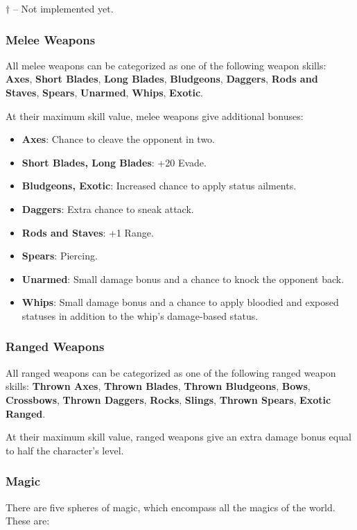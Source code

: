 $\dagger$ -- Not implemented yet.

\subsubsection{Melee Weapons}

All melee weapons can be categorized as one of the following weapon skills: {\bf Axes}, {\bf Short Blades}, {\bf Long Blades}, {\bf Bludgeons}, {\bf Daggers}, {\bf Rods and Staves}, {\bf Spears}, {\bf Unarmed}, {\bf Whips}, {\bf Exotic}.

At their maximum skill value, melee weapons give additional bonuses:

\begin{itemize}
\item{\bf Axes}: Chance to cleave the opponent in two.
\item{\bf Short Blades, Long Blades}: +20 Evade.
\item{\bf Bludgeons, Exotic}: Increased chance to apply status ailments.
\item{\bf Daggers}: Extra chance to sneak attack.
\item{\bf Rods and Staves}: +1 Range.
\item{\bf Spears}: Piercing.
\item{\bf Unarmed}: Small damage bonus and a chance to knock the opponent back.
\item{\bf Whips}: Small damage bonus and a chance to apply bloodied and exposed statuses in addition to the whip's damage-based status.
\end{itemize}

\subsubsection{Ranged Weapons}

All ranged weapons can be categorized as one of the following ranged weapon skills: {\bf Thrown Axes}, {\bf Thrown Blades}, {\bf Thrown Bludgeons}, {\bf Bows}, {\bf Crossbows}, {\bf Thrown Daggers}, {\bf Rocks}, {\bf Slings}, {\bf Thrown Spears}, {\bf Exotic Ranged}.

At their maximum skill value, ranged weapons give an extra damage bonus equal 
to half the character's level.

\subsubsection{Magic}

There are five spheres of magic, which encompass all the magics of the world.  These are:

